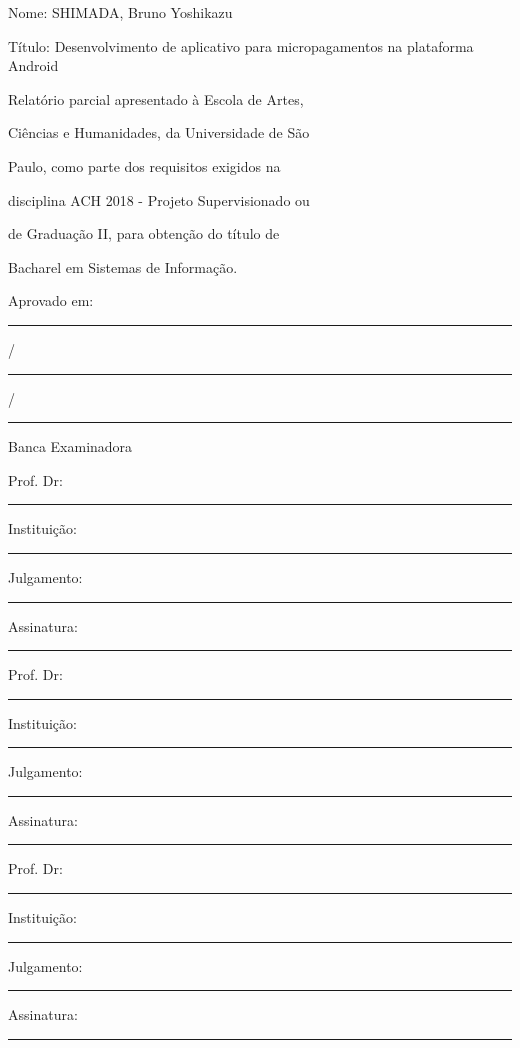 \documentclass[hidelinks,12pt]{article}
\begin{document}
\begin{titlepage}
	\begin{flushleft}
		{\Large Nome: SHIMADA, Bruno Yoshikazu \par}
		{\Large T\'itulo: Desenvolvimento de aplicativo para micropagamentos na plataforma Android \par}
	\end{flushleft}
	\begin{flushright}
		\hspace{7cm}Relat\'orio parcial apresentado \`a Escola de Artes,
		
		\hspace{7cm}Ci\^encias e Humanidades, da Universidade de S\~ao
		
		\hspace{7cm}Paulo, como parte dos requisitos exigidos na
		
		\hspace{7cm}disciplina ACH 2018 - Projeto Supervisionado ou
		
		\hspace{7cm}de Gradua\c{c}\~ao II, para obten\c{c}\~ao do t\'itulo de
		
		\hspace{7cm}Bacharel em Sistemas de Informa\c{c}\~ao.
	\end{flushright}
	\vspace{1cm}
	\begin{flushleft}
		{\Large Aprovado em: \rule{1cm}{1pt}/\rule{1cm}{1pt}/\rule{2cm}{1pt} \par}
	\end{flushleft}
	\vfill
	\centering
		{\Large Banca Examinadora \par}
		\vspace{1cm}
		\begin{flushleft}
			{\Large Prof. Dr:\rule{5cm}{1pt}    Institui\c{c}\~ao:\rule{5cm}{1pt}\par}
			{\Large Julgamento:\rule{4,2cm}{1pt} Assinatura:\rule{5cm}{1pt}\par}
			\vspace{1cm}
			{\Large Prof. Dr:\rule{5cm}{1pt}    Institui\c{c}\~ao:\rule{5cm}{1pt}\par}
			{\Large Julgamento:\rule{4,2cm}{1pt} Assinatura:\rule{5cm}{1pt}\par}
			\vspace{1cm}
			{\Large Prof. Dr:\rule{5cm}{1pt}    Institui\c{c}\~ao:\rule{5cm}{1pt}\par}
			{\Large Julgamento:\rule{4,2cm}{1pt} Assinatura:\rule{5cm}{1pt}\par}
		\end{flushleft}
\end{titlepage}
\newpage
{}
\end{document}
